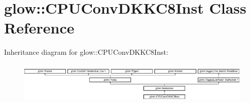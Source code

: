 \hypertarget{classglow_1_1_c_p_u_conv_d_k_k_c8_inst}{}\section{glow\+:\+:C\+P\+U\+Conv\+D\+K\+K\+C8\+Inst Class Reference}
\label{classglow_1_1_c_p_u_conv_d_k_k_c8_inst}
Inheritance diagram for glow\+:\+:C\+P\+U\+Conv\+D\+K\+K\+C8\+Inst\+:\begin{figure}[H]
\begin{center}
\leavevmode
\includegraphics[height=1.991111cm]{classglow_1_1_c_p_u_conv_d_k_k_c8_inst}
\end{center}
\end{figure}
